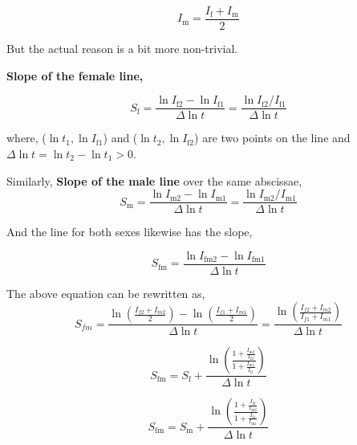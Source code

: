 \documentclass[lineno,sn-basic, Numbered]{sn-jnl}%
\theoremstyle{thmstyleone}%
\theoremstyle{thmstyletwo}%
\theoremstyle{thmstylethree}%
\begin{document}
\begin{equation}
    I_{\text{m}} = \frac{I_{\text{f}} + I_{\text{m}}}{2} 
\end{equation}


But the actual reason is a bit more non-trivial.

\textbf{Slope of the female line,}

\begin{equation}
    S_{\text{f}} = \frac{\ln I_{\text{f2}} - \ln I_{\text{f1}}}{\Delta \ln t} = \frac{\ln I_{\text{f2}} / I_{\text{f1}}}{\Delta \ln t}
\end{equation}
 

where, (\( \ln t_1, \ln I_{\text{f1}} \)) and (\( \ln t_2, \ln I_{\text{f2}} \)) are two points on the line and \( \Delta \ln t = \ln t_2 - \ln t_1 > 0 \).

Similarly, \textbf{Slope of the male line} over the same abscissae,
\begin{equation}
     S_{\text{m}} = \frac{\ln I_{\text{m2}} - \ln I_{\text{m1}}}{\Delta \ln t} = \frac{\ln I_{\text{m2}} / I_{\text{m1}}}{\Delta \ln t} 
\end{equation}


And the line for both sexes likewise has the slope,

\begin{equation}
     S_{\text{fm}} = \frac{\ln I_{\text{fm2}} - \ln I_{\text{fm1}}}{\Delta \ln t} 
\end{equation}

The above equation can be rewritten as,
\begingroup
\large
\hspace{-6em}
\begin{equation}
   S_{fm} = \frac{\ln(\frac{I_{f2} + I_{m2}}{2}) - \ln(\frac{I_{f1} + I_{m1}}{2})}{\Delta \ln t} = \frac{\ln(\frac{I_{f2} + I_{m2}}{I_{f1} + I_{m1}})}{\Delta \ln t}
\end{equation}
\endgroup

\vspace{1cm}
\begin{equation}
     S_{\text{fm}} = S_{\text{f}} + \frac{\ln \left( \frac{1 + \frac{I_{\text{m2}}}{I_{\text{f2}}}}{1 + \frac{I_{\text{m1}}}{I_{\text{f1}}}} \right)}{\Delta \ln t} 
\end{equation}

\vspace{0.5cm}


\begin{equation}
    S_{\text{fm}} = S_{\text{m}} + \frac{\ln \left( \frac{1 + \frac{I_{\text{f2}}}{I_{\text{m2}}}}{1 + \frac{I_{\text{f1}}}{I_{\text{m1}}}} \right)}{\Delta \ln t}
\end{equation}
\end{document}
